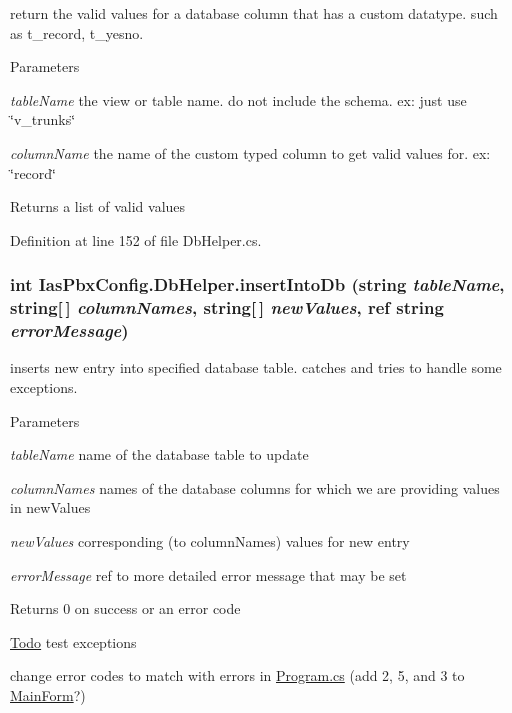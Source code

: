 return the valid values for a database column that has a custom datatype. such as t\_\-record, t\_\-yesno. 
\begin{DoxyParams}{Parameters}
\item[{\em tableName}]the view or table name. do not include the schema. ex: just use \char`\"{}v\_\-trunks\char`\"{} \item[{\em columnName}]the name of the custom typed column to get valid values for. ex: \char`\"{}record\char`\"{} \end{DoxyParams}
\begin{DoxyReturn}{Returns}
a list of valid values 
\end{DoxyReturn}


Definition at line 152 of file DbHelper.cs.\hypertarget{class_ias_pbx_config_1_1_db_helper_ae39e091f5a141a7b43c8baca1ec520f2}{
\subsubsection[{insertIntoDb}]{\setlength{\rightskip}{0pt plus 5cm}int IasPbxConfig.DbHelper.insertIntoDb (string {\em tableName}, \/  string\mbox{[}$\,$\mbox{]} {\em columnNames}, \/  string\mbox{[}$\,$\mbox{]} {\em newValues}, \/  ref string {\em errorMessage})}}
\label{class_ias_pbx_config_1_1_db_helper_ae39e091f5a141a7b43c8baca1ec520f2}


inserts new entry into specified database table. catches and tries to handle some exceptions. 
\begin{DoxyParams}{Parameters}
\item[{\em tableName}]name of the database table to update \item[{\em columnNames}]names of the database columns for which we are providing values in newValues \item[{\em newValues}]corresponding (to columnNames) values for new entry \item[{\em errorMessage}]ref to more detailed error message that may be set \end{DoxyParams}
\begin{DoxyReturn}{Returns}
0 on success or an error code 
\end{DoxyReturn}
\begin{Desc}
\item[\hyperlink{todo__todo000020}{Todo}]test exceptions 

change error codes to match with errors in \hyperlink{_program_8cs}{Program.cs} (add 2, 5, and 3 to \hyperlink{class_ias_pbx_config_1_1_main_form}{MainForm}?) \end{Desc}


